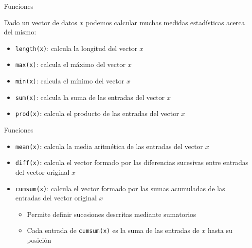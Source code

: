\documentclass[
  ignorenonframetext,
]{beamer}
\providecommand{\tightlist}{%
  \setlength{\itemsep}{0pt}\setlength{\parskip}{0pt}}
\begin{document}
\begin{frame}[fragile]{Funciones}
\protect\hypertarget{funciones-1}{}

Dado un vector de datos \(x\) podemos calcular muchas medidas
estadísticas acerca del mismo:

\begin{itemize}
\tightlist
\item
  \texttt{length(x)}: calcula la longitud del vector \(x\)
\item
  \texttt{max(x)}: calcula el máximo del vector \(x\)
\item
  \texttt{min(x)}: calcula el mínimo del vector \(x\)
\item
  \texttt{sum(x)}: calcula la suma de las entradas del vector \(x\)
\item
  \texttt{prod(x)}: calcula el producto de las entradas del vector \(x\)
\end{itemize}

\end{frame}

\begin{frame}[fragile]{Funciones}
\protect\hypertarget{funciones-2}{}

\begin{itemize}
\tightlist
\item
  \texttt{mean(x)}: calcula la media aritmética de las entradas del
  vector \(x\)
\item
  \texttt{diff(x)}: calcula el vector formado por las diferencias
  sucesivas entre entradas del vector original \(x\)
\item
  \texttt{cumsum(x)}: calcula el vector formado por las sumas acumuladas
  de las entradas del vector original \(x\)

  \begin{itemize}
  \tightlist
  \item
    Permite definir sucesiones descritas mediante sumatorios
  \item
    Cada entrada de \texttt{cumsum(x)} es la suma de las entradas de
    \(x\) hasta su posición
  \end{itemize}
\end{itemize}

\end{frame}
\end{document}
